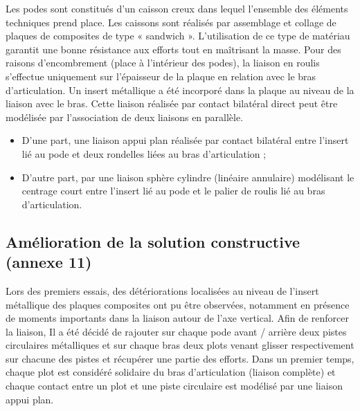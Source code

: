 Les podes sont constitués d’un caisson creux dans lequel l’ensemble des éléments techniques prend place. Les caissons sont réalisés par assemblage et collage de plaques de composites de type « sandwich ». L’utilisation de ce
type de matériau garantit une bonne résistance aux efforts tout en maîtrisant la masse.
Pour des raisons d’encombrement (place à l’intérieur des podes), la liaison en roulis s’effectue uniquement sur l’épaisseur de la plaque en relation avec le bras d’articulation. Un insert métallique a été incorporé dans la plaque au niveau de la liaison avec le bras. Cette liaison réalisée par contact bilatéral direct peut être modélisée par l’association de deux liaisons en parallèle.
\begin{itemize}
\item D’une part, une liaison appui plan réalisée par contact bilatéral entre l’insert lié au pode et deux rondelles liées
au bras d’articulation ;
\item D’autre part, par une liaison sphère cylindre (linéaire annulaire) modélisant le centrage court entre l’insert lié
au pode et le palier de roulis lié au bras d’articulation.
\end{itemize}

\ifprof
\begin{corrige}
\end{corrige}
\else
\fi



\subsection{Amélioration de la solution constructive (annexe 11)}

Lors des premiers essais, des détériorations localisées au niveau de l’insert métallique des plaques composites ont pu être observées, notamment en présence de moments importants dans la liaison autour de l’axe vertical. Afin de
renforcer la liaison, Il a été décidé de rajouter sur chaque pode avant / arrière deux pistes circulaires métalliques et sur chaque bras deux plots venant glisser respectivement sur chacune des pistes et récupérer une partie des efforts.
Dans un premier temps, chaque plot est considéré solidaire du bras d’articulation (liaison complète) et chaque contact entre un plot et une piste circulaire est modélisé par une liaison appui plan.

\ifprof
\begin{corrige}
\end{corrige}
\else
\fi

